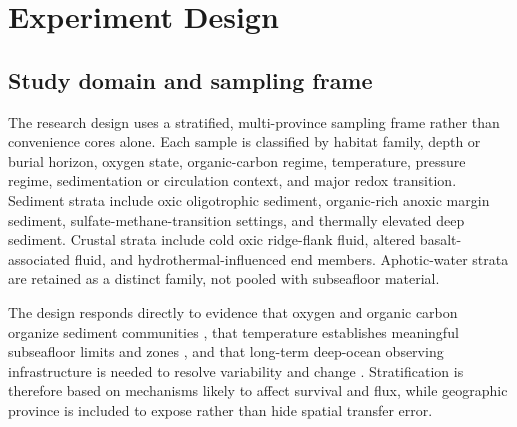 \documentclass[conference]{../../../../Conference-LaTeX-template_10-17-19/IEEEtran}
\begin{document}
\section{Experiment Design}
\subsection{Study domain and sampling frame}
The research design uses a stratified, multi-province sampling frame rather than convenience cores alone. Each sample is classified by habitat family, depth or burial horizon, oxygen state, organic-carbon regime, temperature, pressure regime, sedimentation or circulation context, and major redox transition. Sediment strata include oxic oligotrophic sediment, organic-rich anoxic margin sediment, sulfate-methane-transition settings, and thermally elevated deep sediment. Crustal strata include cold oxic ridge-flank fluid, altered basalt-associated fluid, and hydrothermal-influenced end members. Aphotic-water strata are retained as a distinct family, not pooled with subseafloor material.

The design responds directly to evidence that oxygen and organic carbon organize sediment communities \cite{hoshino2020}, that temperature establishes meaningful subseafloor limits and zones \cite{heuer2020}, and that long-term deep-ocean observing infrastructure is needed to resolve variability and change \cite{levin2019}. Stratification is therefore based on mechanisms likely to affect survival and flux, while geographic province is included to expose rather than hide spatial transfer error.
\end{document}
